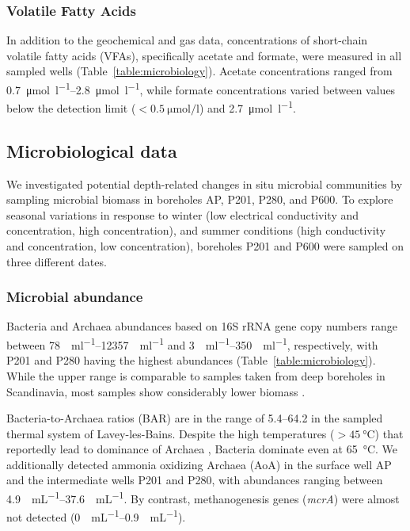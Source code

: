 \subsubsection{Volatile Fatty Acids}
In addition to the geochemical and gas data, concentrations of short-chain volatile fatty acids (VFAs), specifically acetate and formate, were measured in all sampled wells (Table~\ref{table:microbiology}).
Acetate concentrations ranged from \SIrange{0.7}{2.8}{\umol\per\litre}, while formate concentrations varied between values below the detection limit ($< \SI{0.5}{\umol\per\litre}$) and \SI{2.7}{\umol\per\litre}.


\subsection{Microbiological data}
We investigated potential depth-related changes in situ microbial communities by sampling microbial biomass in boreholes AP, P201, P280, and P600.
To explore seasonal variations in response to winter (low electrical conductivity and  concentration, high  concentration), and summer conditions (high conductivity and  concentration, low  concentration), boreholes P201 and P600 were sampled on three different dates.



\subsubsection{Microbial abundance}
Bacteria and Archaea abundances based on 16S rRNA gene copy numbers range between \SIrange{78}{12357}{\copies\per\milli\litre} and \SIrange{3}{350}{\copies\per\milli\litre}, respectively, with P201 and P280 having the highest abundances (Table~\ref{table:microbiology}).
While the upper range is comparable to samples taken from deep boreholes in Scandinavia, most samples show considerably lower biomass \citep{itavaara2011characterization, bomberg2015active}.

Bacteria-to-Archaea ratios (BAR) are in the range of \SIrange{5.4}{64.2}{} in the sampled thermal system of Lavey-les-Bains.
Despite the high temperatures ($>\SI{45}{\celsius}$) that reportedly lead to dominance of Archaea \citep{lagostina2021interactions}, Bacteria dominate even at \SI{65}{\celsius}.
We additionally detected ammonia oxidizing Archaea (AoA) in the surface well AP and the intermediate wells P201 and P280, with abundances ranging between \SIrange{4.9}{37.6}{\copies\per\milli\liter}.
By contrast, methanogenesis genes (\textit{mcrA}) were almost not detected (\SIrange{0}{0.9}{\copies\per\milli\liter}).

